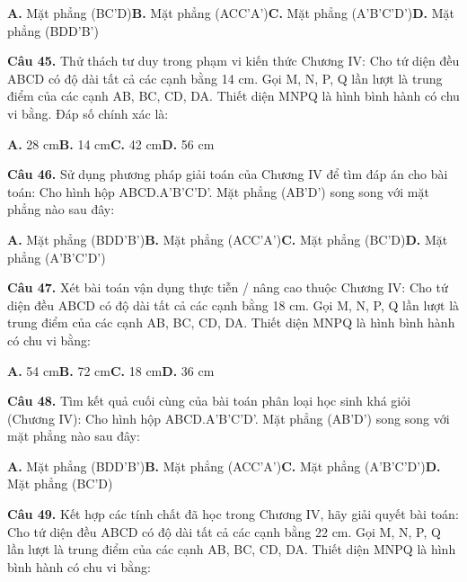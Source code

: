 \documentclass[11pt,a4paper]{article}
\begin{document}
\hspace*{1.5em}\textbf{A.} Mặt phẳng (BC'D)\quad\quad \textbf{B.} Mặt phẳng (ACC'A')\quad\quad \textbf{C.} Mặt phẳng (A'B'C'D')\quad\quad \textbf{D.} Mặt phẳng (BDD'B')\par\vspace{2pt}
\textbf{\color{primary} Câu 45.} Thử thách tư duy trong phạm vi kiến thức Chương IV: Cho tứ diện đều ABCD có độ dài tất cả các cạnh bằng 14 cm. Gọi M, N, P, Q lần lượt là trung điểm của các cạnh AB, BC, CD, DA. Thiết diện MNPQ là hình bình hành có chu vi bằng. Đáp số chính xác là:\par
\hspace*{1.5em}\textbf{A.} 28 cm\quad\quad \textbf{B.} 14 cm\quad\quad \textbf{C.} 42 cm\quad\quad \textbf{D.} 56 cm\par\vspace{2pt}
\textbf{\color{primary} Câu 46.} Sử dụng phương pháp giải toán của Chương IV để tìm đáp án cho bài toán: Cho hình hộp ABCD.A'B'C'D'. Mặt phẳng (AB'D') song song với mặt phẳng nào sau đây:\par
\hspace*{1.5em}\textbf{A.} Mặt phẳng (BDD'B')\quad\quad \textbf{B.} Mặt phẳng (ACC'A')\quad\quad \textbf{C.} Mặt phẳng (BC'D)\quad\quad \textbf{D.} Mặt phẳng (A'B'C'D')\par\vspace{2pt}
\textbf{\color{primary} Câu 47.} Xét bài toán vận dụng thực tiễn / nâng cao thuộc Chương IV: Cho tứ diện đều ABCD có độ dài tất cả các cạnh bằng 18 cm. Gọi M, N, P, Q lần lượt là trung điểm của các cạnh AB, BC, CD, DA. Thiết diện MNPQ là hình bình hành có chu vi bằng:\par
\hspace*{1.5em}\textbf{A.} 54 cm\quad\quad \textbf{B.} 72 cm\quad\quad \textbf{C.} 18 cm\quad\quad \textbf{D.} 36 cm\par\vspace{2pt}
\textbf{\color{primary} Câu 48.} Tìm kết quả cuối cùng của bài toán phân loại học sinh khá giỏi (Chương IV): Cho hình hộp ABCD.A'B'C'D'. Mặt phẳng (AB'D') song song với mặt phẳng nào sau đây:\par
\hspace*{1.5em}\textbf{A.} Mặt phẳng (BDD'B')\quad\quad \textbf{B.} Mặt phẳng (ACC'A')\quad\quad \textbf{C.} Mặt phẳng (A'B'C'D')\quad\quad \textbf{D.} Mặt phẳng (BC'D)\par\vspace{2pt}
\textbf{\color{primary} Câu 49.} Kết hợp các tính chất đã học trong Chương IV, hãy giải quyết bài toán: Cho tứ diện đều ABCD có độ dài tất cả các cạnh bằng 22 cm. Gọi M, N, P, Q lần lượt là trung điểm của các cạnh AB, BC, CD, DA. Thiết diện MNPQ là hình bình hành có chu vi bằng:\par
\end{document}
